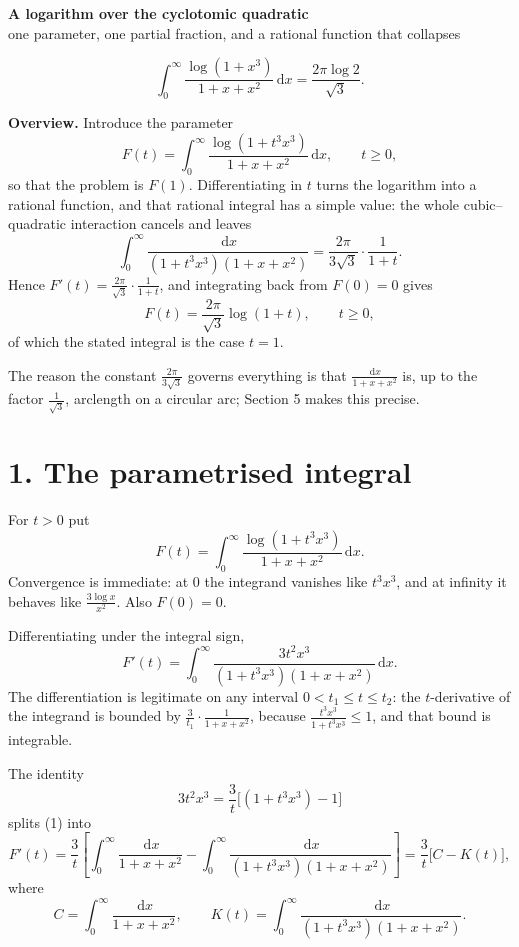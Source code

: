 \documentclass[12pt]{article}
\newcommand{\dd}{\,\mathrm{d}}
\begin{document}
\begin{center}
{\Large\bfseries A logarithm over the cyclotomic quadratic}\\[0.35em]
{\large one parameter, one partial fraction, and a rational function that collapses}
\end{center}

\[
\boxed{\displaystyle
\int_0^\infty\frac{\log(1+x^3)}{1+x+x^2}\dd x
=\frac{2\pi\log2}{\sqrt3}.}
\]

\textbf{Overview.}
Introduce the parameter
\[
F(t)=\int_0^\infty\frac{\log(1+t^3x^3)}{1+x+x^2}\dd x,
\qquad t\ge0,
\]
so that the problem is \(F(1)\). Differentiating in \(t\) turns the
logarithm into a rational function, and that rational integral has a
simple value: the whole cubic--quadratic interaction cancels
and leaves
\[
\int_0^\infty\frac{\dd x}{(1+t^3x^3)(1+x+x^2)}
=\frac{2\pi}{3\sqrt3}\cdot\frac1{1+t}.
\]
Hence \(F'(t)=\frac{2\pi}{\sqrt3}\cdot\frac1{1+t}\), and integrating back
from \(F(0)=0\) gives
\[
\boxed{\displaystyle
F(t)=\frac{2\pi}{\sqrt3}\log(1+t),\qquad t\ge0,}
\]
of which the stated integral is the case \(t=1\).

The reason the constant \(\frac{2\pi}{3\sqrt3}\) governs everything is
that \(\frac{\dd x}{1+x+x^2}\) is, up to the factor \(\frac1{\sqrt3}\),
arclength on a circular arc; Section 5 makes this precise.

\section*{1. The parametrised integral}

For \(t>0\) put
\[
F(t)=\int_0^\infty\frac{\log(1+t^3x^3)}{1+x+x^2}\dd x .
\]
Convergence is immediate: at \(0\) the integrand vanishes like
\(t^3x^3\), and at infinity it behaves like \(\frac{3\log x}{x^2}\).
Also \(F(0)=0\).

Differentiating under the integral sign,
\[
F'(t)=\int_0^\infty\frac{3t^2x^3}{(1+t^3x^3)(1+x+x^2)}\dd x .
\tag{1}
\]
The differentiation is legitimate on any interval \(0<t_1\le t\le t_2\):
the \(t\)-derivative of the integrand is bounded by
\(\frac{3}{t_1}\cdot\frac1{1+x+x^2}\), because
\(\frac{t^3x^3}{1+t^3x^3}\le1\), and that bound is integrable.

The identity
\[
3t^2x^3=\frac{3}{t}\bigl[(1+t^3x^3)-1\bigr]
\]
splits (1) into
\[
F'(t)=\frac3t\left[
\int_0^\infty\frac{\dd x}{1+x+x^2}
-\int_0^\infty\frac{\dd x}{(1+t^3x^3)(1+x+x^2)}
\right]
=\frac3t\bigl[C-K(t)\bigr],
\tag{2}
\]
where
\[
C=\int_0^\infty\frac{\dd x}{1+x+x^2},
\qquad
K(t)=\int_0^\infty\frac{\dd x}{(1+t^3x^3)(1+x+x^2)} .
\]
\end{document}
